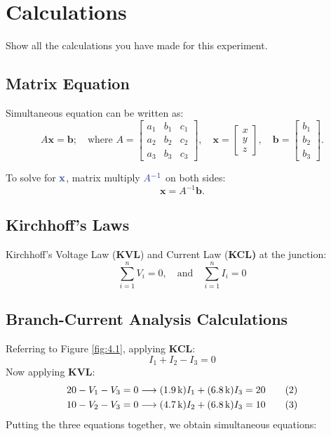 \setlength{\parindent}{0pt} 

\section{Calculations}\label{appendix:A}
Show all the calculations you have made for this experiment.
\subsection{Matrix Equation}
Simultaneous equation can be written as:
\begin{equation*}
    A \mathbf{x} = \mathbf{b};\quad \text{where } A =
    \begin{bmatrix}
        a_1 & b_1 & c_1 \\
        a_2 & b_2 & c_2 \\
        a_3 & b_3 & c_3
    \end{bmatrix}, \quad
    \mathbf{x} =
    \begin{bmatrix}
        x \\ y \\ z
    \end{bmatrix}, \quad
    \mathbf{b} =
    \begin{bmatrix}
        b_1 \\ b_2 \\ b_3
    \end{bmatrix}.
\end{equation*}

\noindent To solve for $\mbluebf{x}$, matrix multiply $\mblue{A^{-1}}$ on both sides:
\begin{equation}
    \mathbf{x}=A^{-1}\mathbf{b}.
\end{equation}

\subsection{Kirchhoff's Laws}
Kirchhoff's Voltage Law (\textbf{KVL}) and Current Law (\textbf{KCL)} at the junction:
\begin{equation}
    \sum_{i=1}^{n} V_i = 0,\quad\text{and}\quad \sum_{i=1}^{n} I_i = 0
\end{equation}

\subsection{Branch-Current Analysis Calculations}
Referring to Figure \ref{fig:4.1}, applying \textbf{KCL}:
\begin{equation*}
    I_1+I_2-I_3=0\tag{1}
\end{equation*}
Now applying \textbf{KVL}:
\begin{align*}
    20-V_1-V_3=0\longrightarrow \qty(1.9\,\text{k})I_1+\qty(6.8\,\text{k})I_3&=20 \tag{2}\\
    10-V_2-V_3=0\longrightarrow \qty(4.7\,\text{k})I_2+\qty(6.8\,\text{k})I_3&=10 \tag{3}
\end{align*}
Putting the three equations together, we obtain simultaneous equations:

